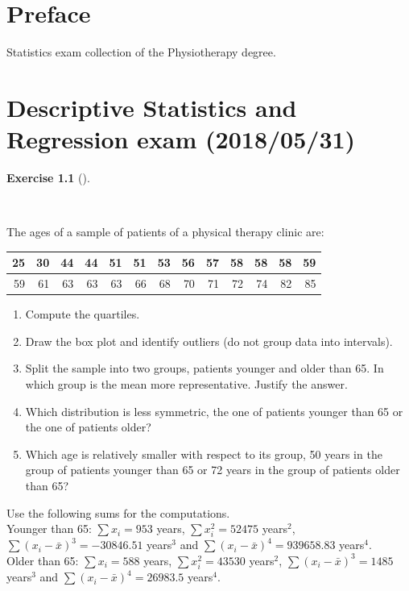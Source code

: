 \documentclass[
  a4paper,
]{scrreport}
\theoremstyle{definition}
\newtheorem{exercise}{Exercise}[chapter]
\theoremstyle{remark}
\begin{document}
\hypertarget{preface}{%
\chapter*{Preface}\label{preface}}


Statistics exam collection of the Physiotherapy degree.


\hypertarget{descriptive-statistics-and-regression-exam-20180531}{%
\chapter{Descriptive Statistics and Regression exam
(2018/05/31)}\label{descriptive-statistics-and-regression-exam-20180531}}

\begin{exercise}[]\protect\hypertarget{exr-1}{}\label{exr-1}

~

The ages of a sample of patients of a physical therapy clinic are:

\begin{table}
\centering
\begin{tabular}{r|r|r|r|r|r|r|r|r|r|r|r|r}
\hline
25 & 30 & 44 & 44 & 51 & 51 & 53 & 56 & 57 & 58 & 58 & 58 & 59\\
\hline
59 & 61 & 63 & 63 & 63 & 66 & 68 & 70 & 71 & 72 & 74 & 82 & 85\\
\hline
\end{tabular}
\end{table}

\begin{enumerate}
\def\labelenumi{\alph{enumi}.}
\item
  Compute the quartiles.
\item
  Draw the box plot and identify outliers (do not group data into
  intervals).
\item
  Split the sample into two groups, patients younger and older than 65.
  In which group is the mean more representative. Justify the answer.
\item
  Which distribution is less symmetric, the one of patients younger than
  65 or the one of patients older?
\item
  Which age is relatively smaller with respect to its group, 50 years in
  the group of patients younger than 65 or 72 years in the group of
  patients older than 65?
\end{enumerate}

Use the following sums for the computations.\\
Younger than 65: \(\sum x_i=953\) years, \(\sum x_i^2=52475\)
years\(^2\), \(\sum (x_i-\bar x)^3=-30846.51\) years\(^3\) and
\(\sum (x_i-\bar x)^4=939658.83\) years\(^4\).\\
Older than 65: \(\sum x_i=588\) years, \(\sum x_i^2=43530\) years\(^2\),
\(\sum (x_i-\bar x)^3=1485\) years\(^3\) and
\(\sum (x_i-\bar x)^4=26983.5\) years\(^4\).

\end{exercise}
\end{document}
